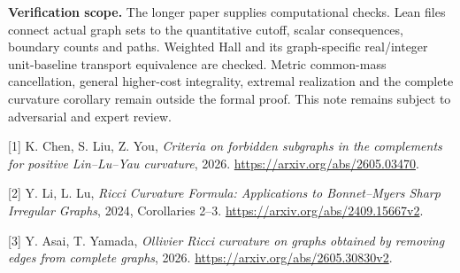\documentclass[10pt]{article}
\begin{document}
\textbf{Verification scope.}
The longer paper supplies computational checks. Lean files connect actual graph sets to the quantitative cutoff, scalar consequences, boundary counts and paths. Weighted Hall and its graph-specific real/integer unit-baseline transport equivalence are checked. Metric common-mass cancellation, general higher-cost integrality, extremal realization and the complete curvature corollary remain outside the formal proof. This note remains subject to adversarial and expert review.

\small
[1] K. Chen, S. Liu, Z. You, \emph{Criteria on forbidden subgraphs in the complements for positive Lin--Lu--Yau curvature}, 2026. \url{https://arxiv.org/abs/2605.03470}.

[2] Y. Li, L. Lu, \emph{Ricci Curvature Formula: Applications to Bonnet--Myers Sharp Irregular Graphs}, 2024, Corollaries 2--3. \url{https://arxiv.org/abs/2409.15667v2}.

[3] Y. Asai, T. Yamada, \emph{Ollivier Ricci curvature on graphs obtained by removing edges from complete graphs}, 2026. \url{https://arxiv.org/abs/2605.30830v2}.
\end{document}
